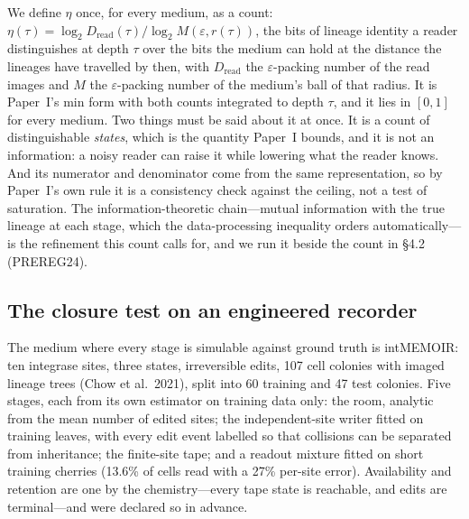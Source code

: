 \documentclass[11pt]{article}
\begin{document}
We define $\eta$ once, for every medium, as a count: $\eta(\tau)=\log_2 D_{\mathrm{read}}(\tau)/\log_2 M(\varepsilon,r(\tau))$, the bits of lineage identity a reader distinguishes at depth $\tau$ over the bits the medium can hold at the distance the lineages have travelled by then, with $D_{\mathrm{read}}$ the $\varepsilon$-packing number of the read images and $M$ the $\varepsilon$-packing number of the medium's ball of that radius. It is Paper~I's min form with both counts integrated to depth $\tau$, and it lies in $[0,1]$ for every medium. Two things must be said about it at once. It is a count of distinguishable \emph{states}, which is the quantity Paper~I bounds, and it is not an information: a noisy reader can raise it while lowering what the reader knows. And its numerator and denominator come from the same representation, so by Paper~I's own rule it is a consistency check against the ceiling, not a test of saturation. The information-theoretic chain---mutual information with the true lineage at each stage, which the data-processing inequality orders automatically---is the refinement this count calls for, and we run it beside the count in \S4.2 (PREREG24).

\subsection{The closure test on an engineered recorder}

The medium where every stage is simulable against ground truth is intMEMOIR: ten integrase sites, three states, irreversible edits, 107 cell colonies with imaged lineage trees (Chow et al.\ 2021), split into 60 training and 47 test colonies. Five stages, each from its own estimator on training data only: the room, analytic from the mean number of edited sites; the independent-site writer fitted on training leaves, with every edit event labelled so that collisions can be separated from inheritance; the finite-site tape; and a readout mixture fitted on short training cherries (13.6\% of cells read with a 27\% per-site error). Availability and retention are one by the chemistry---every tape state is reachable, and edits are terminal---and were declared so in advance.
\end{document}
